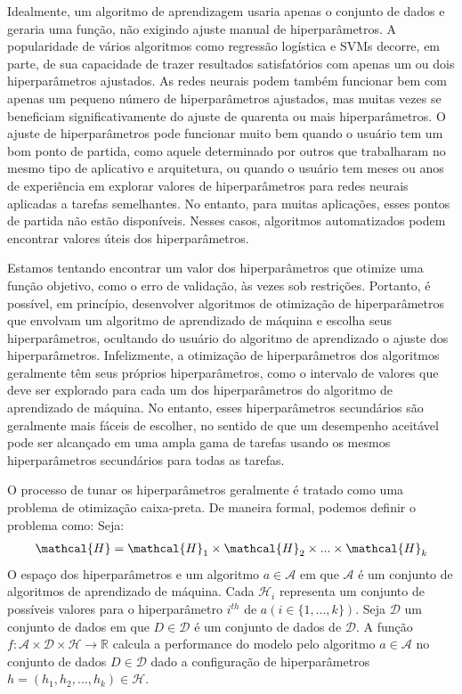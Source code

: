 Idealmente, um algoritmo de aprendizagem usaria apenas o conjunto de dados e geraria uma função, não exigindo ajuste manual de hiperparâmetros. A popularidade de vários  algoritmos como regressão logística e SVMs decorre, em parte, de sua capacidade de trazer resultados satisfatórios com apenas um ou dois hiperparâmetros ajustados. As redes neurais podem também funcionar bem com apenas um pequeno número de hiperparâmetros ajustados, mas muitas vezes se beneficiam significativamente do ajuste de quarenta ou mais hiperparâmetros. O ajuste de hiperparâmetros pode funcionar muito bem quando o usuário tem um bom ponto de partida, como aquele determinado por outros que trabalharam no mesmo tipo de aplicativo e arquitetura, ou quando o usuário tem meses ou anos de experiência em explorar valores de hiperparâmetros para redes neurais aplicadas a tarefas semelhantes. No entanto, para muitas aplicações, esses pontos de partida não estão disponíveis. Nesses casos, algoritmos automatizados podem encontrar valores úteis dos hiperparâmetros\cite{tree:tunning}.

Estamos tentando encontrar um valor dos hiperparâmetros que otimize uma função objetivo, como o erro de validação, às vezes sob restrições. Portanto, é possível, em princípio, desenvolver algoritmos de otimização de hiperparâmetros que envolvam um algoritmo de aprendizado de máquina e escolha seus hiperparâmetros, ocultando do usuário do algoritmo de aprendizado o ajuste dos hiperparâmetros. Infelizmente, a otimização de hiperparâmetros dos algoritmos geralmente têm seus próprios hiperparâmetros, como o intervalo de valores que deve ser explorado para cada um dos hiperparâmetros do algoritmo de aprendizado de máquina. No entanto, esses hiperparâmetros secundários são geralmente mais fáceis de escolher, no sentido de que um desempenho aceitável pode ser alcançado em uma ampla gama de tarefas usando os mesmos hiperparâmetros secundários para todas as tarefas.

O processo de tunar os hiperparâmetros geralmente é tratado como uma problema de otimização caixa-preta. De maneira formal, podemos definir o problema como:
Seja:
\begin{gather*}
    \simbolo{\mathcal{H}}{Espaço de Hiperparâmetro} \mathcal{H} = \mathcal{H}_1 \times \mathcal{H}_2 \times ... \times \mathcal{H}_k
\end{gather*}
O espaço dos hiperparâmetros e um algoritmo $a\in \mathcal{A}$ em que $\mathcal{A}$ é um conjunto de algoritmos de aprendizado de máquina. Cada $\mathcal{H}_i$ representa um conjunto de possíveis valores para o hiperparâmetro $i^{th}$ de $a(i\in\{1,...,k\})$. Seja $\mathcal{D}$ um conjunto de dados em que $D\in \mathcal{D}$ é um conjunto de dados de $\mathcal{D}$. A função $f:\mathcal{A}\times \mathcal{D} \times \mathcal{H}\rightarrow \mathbb{R}$ calcula a performance do modelo pelo algoritmo $a\in \mathcal{A}$ no conjunto de dados $D\in \mathcal{D}$ dado a configuração de hiperparâmetros $h=(h_1,h_2,...,h_k)\in\mathcal{H}$.

